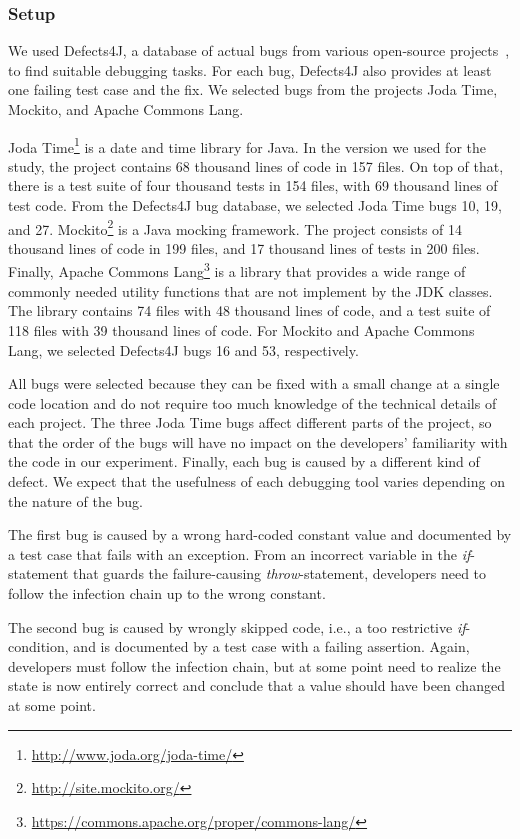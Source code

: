 \documentclass[
			english,
			review,
			]{elsarticle}
\begin{document}
\subsubsection{Setup}

We used Defects4J, a database of actual bugs from various open-source projects~\cite{just_defects4j_2014}, to find suitable debugging tasks.
For each bug, Defects4J also provides at least one failing test case and the fix.
We selected bugs from the projects Joda Time, Mockito, and Apache Commons Lang.

Joda Time\footnote{\url{http://www.joda.org/joda-time/}} is a date and time library for Java.
In the version we used for the study, the project contains 68 thousand lines of code in 157 files.
On top of that, there is a test suite of four thousand tests in 154 files, with 69 thousand lines of test code.
From the Defects4J bug database, we selected Joda Time bugs 10, 19, and 27.
Mockito\footnote{\url{http://site.mockito.org/}} is a Java mocking framework.
The project consists of 14 thousand lines of code in 199 files, and 17 thousand lines of tests in 200 files.
Finally, Apache Commons Lang\footnote{\url{https://commons.apache.org/proper/commons-lang/}} is a library that provides a wide range of commonly needed utility functions that are not implement by the JDK classes.
The library contains 74 files with 48 thousand lines of code, and a test suite of 118 files with 39 thousand lines of code.
For Mockito and Apache Commons Lang, we selected Defects4J bugs 16 and 53, respectively.

All bugs were selected because they can be fixed with a small change at a single code location and do not require too much knowledge of the technical details of each project.
The three Joda Time bugs affect different parts of the project, so that the order of the bugs will have no impact on the developers' familiarity with the code in our experiment.
Finally, each bug is caused by a different kind of defect.
We expect that the usefulness of each debugging tool varies depending on the nature of the bug.

The first bug is caused by a wrong hard-coded constant value and documented by a test case that fails with an exception.
From an incorrect variable in the \emph{if}-statement that guards the failure-causing \emph{throw}-statement, developers need to follow the infection chain up to the wrong constant.

The second bug is caused by wrongly skipped code, i.e., a too restrictive \textit{if}-condition, and is documented by a test case with a failing assertion.
Again, developers must follow the infection chain, but at some point need to realize the state is now entirely correct and conclude that a value should have been changed at some point.
\end{document}
